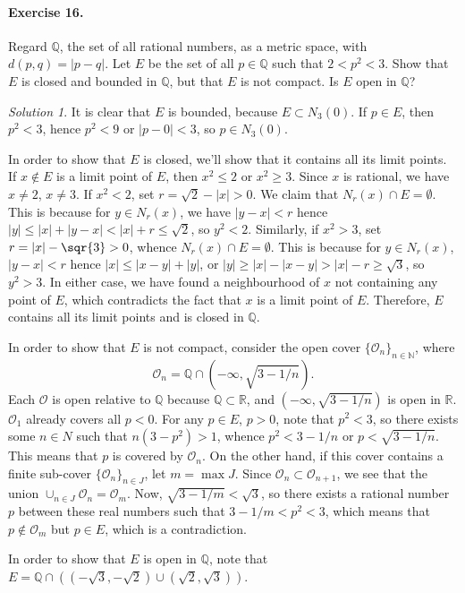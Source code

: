 \documentclass[11pt]{report}
\def\R{\mathbb{R}}
\def\Q{\mathbb{Q}}
\def\N{\mathbb{N}}
\def\O{\mathscr{O}}
\theoremstyle{remark}
\newtheorem*{solution}{Solution}
\begin{document}
    \paragraph{Exercise 16.} Regard $\Q$, the set of all rational numbers, as a
    metric space, with $d(p, q) = |p - q|$. Let $E$ be the set of all $p \in \Q$
    such that $2 < p^2 < 3$. Show that $E$ is closed and bounded in $\Q$, but that
    $E$ is not compact. Is $E$ open in $\Q$?
    \begin{solution}
        It is clear that $E$ is bounded, because $E \subset N_3(0)$. If $p \in E$, 
        then $p^2 < 3$, hence $p^2 < 9$ or $|p - 0| < 3$, so $p \in N_3(0)$.

        In order to show that $E$ is closed, we'll show that it contains all its
        limit points. If $x \notin E$ is a limit point of $E$, then $x^2 \leq 2$ or
        $x^2 \geq 3$. Since $x$ is rational, we have $x \neq 2$, $x \neq 3$. If $x^2
        < 2$, set $r = \sqrt{2} - |x| > 0$. We claim that $N_r(x) \cap E =
        \emptyset$. This is because for $y \in N_r(x)$, we have $|y - x| < r$ hence
        $|y| \leq |x| + |y - x| < |x| + r \leq \sqrt{2}$, so $y^2 < 2$. Similarly,
        if $x^2 > 3$, set $r = |x| - \sqr{3} > 0$, whence $N_r(x) \cap E =
        \emptyset$. This is because for $y \in N_r(x)$, $|y - x| < r$ hence $|x|
        \leq |x - y| + |y|$, or $|y| \geq |x| - |x - y| > |x| - r \geq \sqrt{3}$, so
        $y^2 > 3$. In either case, we have found a neighbourhood of $x$ not
        containing any point of $E$, which contradicts the fact that $x$ is a limit
        point of $E$. Therefore, $E$ contains all its limit points and is closed in
        $\Q$.

        In order to show that $E$ is not compact, consider the open cover
        $\{\O_n\}_{n \in \N}$, where \[
            \O_n = \Q \cap (-\infty, \sqrt{3 - 1 / n}).
        \] Each $\O$ is open relative to $\Q$ because $\Q \subset \R$, and
        $(-\infty, \sqrt{3 - 1 / n})$ is open in $\R$. $\O_1$ already covers all $p
        < 0$. For any $p \in E$, $p > 0$, note that $p^2 < 3$, so there exists some
        $n \in N$ such that $n(3 - p^2) > 1$, whence $p^2 < 3 - 1 / n$ or $p <
        \sqrt{3 - 1 / n}$. This means that $p$ is covered by $\O_n$.
        On the other hand, if this cover contains a finite sub-cover $\{\O_n\}_{n
        \in J}$, let $m = \max{J}$. Since $\O_n \subset \O_{n + 1}$, we see that the
        union $\cup_{n \in J}\O_n = \O_m$. Now, $\sqrt{3 - 1 / m} < \sqrt{3}$, so
        there exists a rational number $p$ between these real numbers such that $3 -
        1 / m < p^2 < 3$, which means that $p \notin \O_m$ but $p \in E$, which is a
        contradiction.

        In order to show that $E$ is open in $\Q$, note that $E = \Q \cap
        ((-\sqrt{3}, -\sqrt{2}) \cup (\sqrt{2}, \sqrt{3}))$.
    \end{solution}
    
\end{document}
